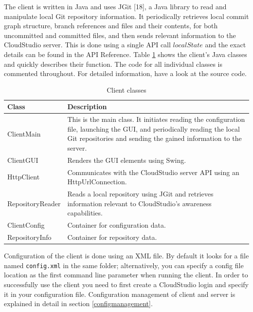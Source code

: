 The client is written in Java and uses JGit [18], a Java library to read and manipulate local Git repository information. It periodically retrieves local commit graph structure, branch references and files and their contents, for both uncommitted and committed files, and then sends relevant information to the CloudStudio server. This is done using a single API call $localState$ and the exact details can be found in the API Reference. Table \ref{table:clientclasses} shows the client's Java classes and quickly describes their function. The code for all individual classes is commented throughout. For detailed information, have a look at the source code. \\




\begin{table}

    \scriptsize
    \begin{tabularx}{\textwidth}{ | l | X | }
    \hline
\textbf{Class} & \textbf{Description} \\ \hline
ClientMain & This is the main class. It initiates reading the configuration file, launching the GUI, and periodically reading the local Git repositories and sending the gained information to the server. \\ \hline
ClientGUI & Renders the GUI elements using Swing. \\ \hline
HttpClient & Communicates with the CloudStudio server API using an HttpUrlConnection. \\ \hline
RepositoryReader & Reads a local repository using JGit and retrieves information relevant to CloudStudio's awareness capabilities. \\ \hline
ClientConfig & Container for configuration data. \\ \hline
RepositoryInfo & Container for repository data. \\ \hline
    \end{tabularx}
    
    \centering
  \caption{Client classes}
  \label{table:clientclasses}
\end{table}


Configuration of the client is done using an XML file. By default it looks for a file named \texttt{config.xml} in the same folder; alternatively, you can specify a config file location as the first command line parameter when running the client. In order to successfully use the client you need to first create a CloudStudio login and specify it in your configuration file. Configuration management of client and server is explained in detail in section \ref{configmanagement}. \\

